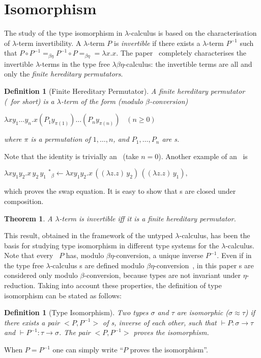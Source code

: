 \documentclass[UKenglish]{eptcs}
\newtheorem{definition}[fact]{Definition}
\newtheorem{theorem}[fact]{Theorem}
\newcommand{\dup}{\! : \!}
\newcommand{\fhp}{\text{\small FHP}}   \newcommand{\fhi}{\text{\small FHI}}   \newcommand{\CC}{\mathcal{C}}
\newcommand{\iso}{\approx}
\newcommand{\mtob}{\;^*\!\!\!\!{_\beta}\!\!\longleftarrow}
\newcommand{\labelx}[1]{\label{#1}}
\newcommand{\myformula}[1]{\\[0.5pt]\centerline{#1}}
\begin{document}
\section{Isomorphism} \label{iso}
The study of the type isomorphism in $\lambda$-calculus is based on the characterisation of $\lambda$-term invertibility. A $\lambda$-term $P $ is \textit{invertible} if there exists a
$\lambda$-term $P^{-1}$ such that $P \circ  P^{-1} =_{\beta\eta} P^{-1}\circ P =_{\beta\eta}  = \lambda x.x$. The paper~\cite{Dezani} completely characterises the invertible
$\lambda$-terms in the type free $\lambda \beta \eta$-calculus: the invertible terms are all and only the
\textit{finite hereditary permutators}.
\begin{definition}
[Finite Hereditary Permutator] \labelx{fhp}A \emph{finite
hereditary permutator} (\fhp\ for short) is a $\lambda$-term of the form (modulo $\beta$-conversion)
\myformula{$\lambda x y_{1}\dots y_{n}.x(P_1 y_{\pi(1)})\dots (P_n y_{\pi (n)}) \; \; \;(n \geq  0)$}
where  $\pi$ is a permutation of $1,\dots,n$, and $P_1,\ldots,P_n$ are \fhp s.
\end{definition}
\noindent
Note that the identity  is trivially an \fhp\ (take $n=0$). Another example of an \fhp\ is
\myformula{$\lambda x y_1 y_2. x\,y_2\,y_1 \mtob \lambda x y_1 y_2. x\,((\lambda z. z)\,y_2)\,((\lambda z. z)\,y_1),$}
which proves the swap equation. It is easy to show that \fhp s are closed under composition.


\begin{theorem}
 A $\lambda$-term is invertible iff it
is a finite hereditary permutator.
\end{theorem}

This result,  obtained in the framework of the untyped
$\lambda$-calculus, has been the basis for studying type
isomorphism in different type systems for the $\lambda$-calculus.
Note that
every \fhp\  $P$ has, modulo $\beta \eta$-conversion, a unique
inverse $P^{-1}$.
Even if in the type free $\lambda$-calculus \fhp s are defined modulo $\beta\eta$-conversion~\cite{Dezani}, in this paper \fhp s are considered only modulo $\beta$-conversion, because types are not invariant under $\eta$-reduction.
Taking into account these properties, the definition of type
isomorphism can be
stated as follows:
\begin{definition}[Type Isomorphism]\labelx{ti}
Two types $\sigma$  and  $\tau$ are {\em isomorphic} ($
\sigma \iso \tau$) if there exists a pair $<P,P^{-1}>$ of \fhp s, inverse of each other, such that $\vdash
P\dup \sigma \rightarrow \tau$ and $\vdash P^{-1}
\dup \tau\rightarrow\sigma$. The pair
$<P,P^{-1}>$
\textit{proves} the isomorphism.
\end{definition}
\noindent
When $P=P^{-1}$
one can simply write ``$P$ proves the isomorphism''.
\end{document}
